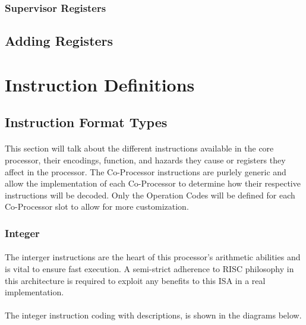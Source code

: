 \documentclass[letterpaper, 11pt]{article}
\begin{document}
\subsubsection{Supervisor Registers}
\subsection{Adding Registers}


\section{Instruction Definitions}
\subsection{Instruction Format Types}
\paragraph{}This section will talk about the different instructions available in the core processor, their encodings, function, and hazards
they cause or registers they affect in the processor. The Co-Processor instructions are purlely generic and allow the implementation of
each Co-Processor to determine how their respective instructions will be decoded. Only the Operation Codes will be defined for each 
Co-Processor slot to allow for more customization.
\subsubsection{Integer}
\paragraph{}The interger instructions are the heart of this processor's arithmetic abilities and is vital to ensure fast execution. A semi-strict
adherence to RISC philosophy in this architecture is required to exploit any benefits to this ISA in a real implementation.
\paragraph{}The integer instruction coding with descriptions, is shown in the diagrams below.
\end{document}
